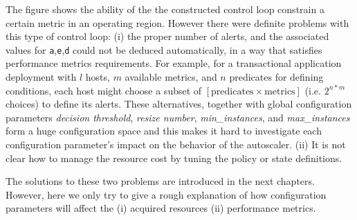 The figure shows the ability of the the constructed control loop constrain a certain metric in an operating region. 
However there were definite problems with this type of control loop:
(i) the proper number of alerts, and the associated values for \texttt{a},\texttt{e},\texttt{d} could not be deduced automatically, in a way that satisfies performance metrics requirements. 
For example, for a transactional application deployment with $l$ hosts, $m$ available metrics, and $n$ predicates for defining conditions,
 each host might choose a subset of $[\text{predicates} \times \text{metrics}]$ (i.e. $2^{n*m}$ choices) to define its alerts.
These alternatives, together with global configuration parameters \textit{decision threshold}, \textit{resize number}, \textit{min\_instances}, and \textit{max\_instances} form a huge configuration space and this makes it hard to investigate each configuration parameter's impact on the behavior of the autoscaler.    
(ii) It is not clear how to manage the resource cost by tuning the policy or state definitions. 

The solutions to these two problems are introduced in the next chapters. 
However, here we only try to give a rough explanation of how configuration parameters will affect the (i) acquired resources (ii) performance metrics.  
% 

